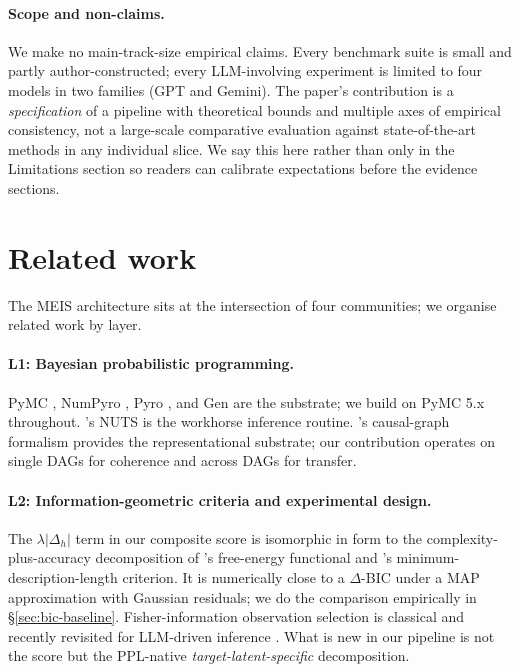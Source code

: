 \documentclass{article}
\begin{document}
\paragraph{Scope and non-claims.}
We make no main-track-size empirical claims. Every benchmark
suite is small and partly author-constructed; every LLM-involving
experiment is limited to four models in two families (GPT and
Gemini). The paper's contribution is a \emph{specification} of a
pipeline with theoretical bounds and multiple axes of empirical
consistency, not a large-scale comparative evaluation against
state-of-the-art methods in any individual slice. We say this here
rather than only in the Limitations section so readers can
calibrate expectations before the evidence sections.

\section{Related work}
\label{sec:related}

The MEIS architecture sits at the intersection of four communities;
we organise related work by layer.

\paragraph{L1: Bayesian probabilistic programming.}
PyMC \citep{salvatier2016pymc}, NumPyro \citep{phan2019numpyro}, Pyro
\citep{bingham2019pyro}, and Gen \citep{cusumano2019gen} are the
substrate; we build on PyMC 5.x throughout. \citet{hoffman2014nuts}'s
NUTS is the workhorse inference routine. \citet{pearl1988probabilistic,
pearl2000causality}'s causal-graph formalism provides the
representational substrate; our contribution operates on single
DAGs for coherence and across DAGs for transfer.

\paragraph{L2: Information-geometric criteria and experimental design.}
The $\lambda |\Delta_{h}|$ term in our composite score is
isomorphic in form to the complexity-plus-accuracy decomposition
of \citet{friston2010free}'s free-energy functional and
\citet{rissanen1978modelingShortestDescription, grunwald2007mdl}'s
minimum-description-length criterion. It is numerically close to a
$\Delta$-BIC \citep{schwarz1978} under a MAP approximation with
Gaussian residuals; we do the comparison empirically in
\S\ref{sec:bic-baseline}. Fisher-information observation selection is
classical \citep{chaloner1995bed, ryan2016modernreview} and recently
revisited for LLM-driven inference \citep{huan2024modernbed}. What is
new in our pipeline is not the score but the PPL-native
\emph{target-latent-specific} decomposition.
\end{document}
